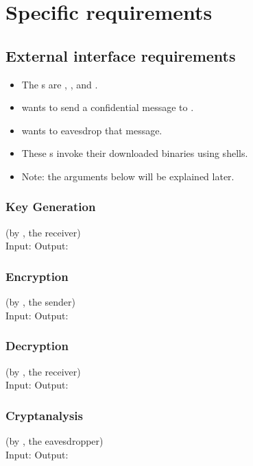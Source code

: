 \section{Specific requirements}
\vp


\subsection{External interface requirements}

\begin{itemize}
\item The \eu s are \alice, \bob, and \eve.
\item \alice{} wants to send a confidential message to \bob.
\item \eve{} wants to eavesdrop that message.
\item These \eu s invoke their downloaded \cry{} binaries
  using \cl{} shells.
\item Note: the \cl{} arguments below will be explained later.
\end{itemize}

\subsubsection{Key Generation}
(by \bob, the receiver) \\ \medskip
Input: \generatekeysin
Output: \generatekeysout

\subsubsection{Encryption}
(by \alice, the sender)  \\ \medskip
Input: \encryptin
Output: \encryptout

\subsubsection{Decryption}
(by \bob, the receiver) \\ \medskip
Input: \decryptin
Output: \decryptout

\subsubsection{Cryptanalysis}
(by \eve, the eavesdropper) \\ \medskip
Input: \cryptanalyzein
Output: \cryptanalyzeout

